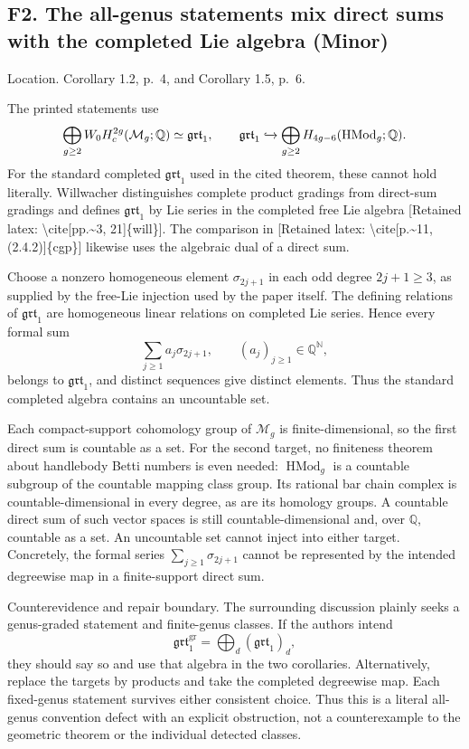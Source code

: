 \documentclass[10pt]{article}
\begin{document}
\subsection*{F2. The all-genus statements mix direct sums with the completed Lie algebra (Minor)}
Location. Corollary 1.2, p. 4, and Corollary 1.5, p. 6.\par
The printed statements use \[\bigoplus_{g\ge2}W_0H_c^{2g}(\mathcal M_g;\mathbb Q)\simeq\mathfrak{grt}_1,
 \qquad
 \mathfrak{grt}_1\xhookrightarrow{}
       \bigoplus_{g\ge2}H_{4g-6}(\operatorname{HMod}_g;\mathbb Q).\] For the standard completed \(\mathfrak{grt}_1\) used in the cited theorem, these cannot hold literally. Willwacher distinguishes complete product gradings from direct-sum gradings and defines \(\mathfrak{grt}_1\) by Lie series in the completed free Lie algebra [Retained latex: \textbackslash{}cite[pp.\textasciitilde{}3, 21]\{will\}]. The comparison in [Retained latex: \textbackslash{}cite[p.\textasciitilde{}11, (2.4.2)]\{cgp\}] likewise uses the algebraic dual of a direct sum.\par
Choose a nonzero homogeneous element \(\sigma_{2j+1}\) in each odd degree \(2j+1\ge3\), as supplied by the free-Lie injection used by the paper itself. The defining relations of \(\mathfrak{grt}_1\) are homogeneous linear relations on completed Lie series. Hence every formal sum \[\sum_{j\ge1}a_j\sigma_{2j+1},\qquad (a_j)_{j\ge1}\in\mathbb Q^{\mathbb N},\] belongs to \(\mathfrak{grt}_1\), and distinct sequences give distinct elements. Thus the standard completed algebra contains an uncountable set.\par
Each compact-support cohomology group of \(\mathcal M_g\) is finite-dimensional, so the first direct sum is countable as a set. For the second target, no finiteness theorem about handlebody Betti numbers is even needed: \(\operatorname{HMod}_g\) is a countable subgroup of the countable mapping class group. Its rational bar chain complex is countable-dimensional in every degree, as are its homology groups. A countable direct sum of such vector spaces is still countable-dimensional and, over \(\mathbb Q\), countable as a set. An uncountable set cannot inject into either target. Concretely, the formal series \(\sum_{j\ge1}\sigma_{2j+1}\) cannot be represented by the intended degreewise map in a finite-support direct sum.\par
Counterevidence and repair boundary. The surrounding discussion plainly seeks a genus-graded statement and finite-genus classes. If the authors intend \[\mathfrak{grt}_1^{\mathrm{gr}}=\bigoplus_d(\mathfrak{grt}_1)_d,\] they should say so and use that algebra in the two corollaries. Alternatively, replace the targets by products and take the completed degreewise map. Each fixed-genus statement survives either consistent choice. Thus this is a literal all-genus convention defect with an explicit obstruction, not a counterexample to the geometric theorem or the individual detected classes.\par
\end{document}
